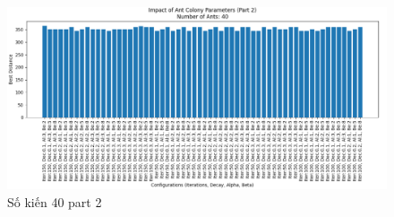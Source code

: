 \documentclass[14pt]{article}
\begin{document}
\begin{center}
		\begin{figure}[htbp]
			\centering
			\includegraphics[width=\textwidth]{./Image/40_part2.png}
			\caption{Số kiến 40 part 2}
			\label{fig:mylabel}
		\end{figure}
		

\end{center}
\end{document}
